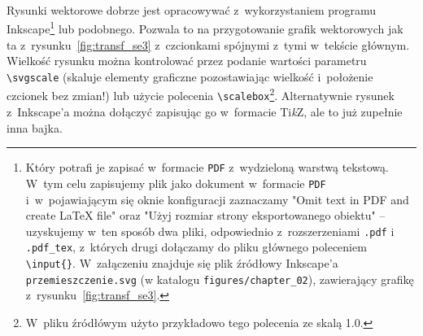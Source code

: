 {\red
  Rysunki wektorowe dobrze jest opracowywać z~wykorzystaniem programu Inkscape\footnote{\red Który potrafi je zapisać w~formacie \texttt{PDF} z~wydzieloną warstwą tekstową. W~tym celu zapisujemy plik jako dokument w~formacie \texttt{PDF} i~w~pojawiającym się oknie konfiguracji zaznaczamy "Omit text in PDF and create LaTeX file" oraz "Użyj rozmiar strony eksportowanego obiektu" -- uzyskujemy w~ten sposób dwa pliki, odpowiednio z~rozszerzeniami \texttt{.pdf} i \texttt{.pdf\_tex}\footnotemark, z~których drugi dołączamy do pliku głównego poleceniem \texttt{\textbackslash input\{\}}.  W~załączeniu znajduje się plik źródłowy Inkscape'a \texttt{przemieszczenie.svg} (w katalogu \texttt{figures/chapter\_02}), zawierający grafikę z~rysunku~\ref{fig:transf_se3}.}  \cite{inkscape} lub podobnego. Pozwala to na przygotowanie grafik wektorowych jak ta z~rysunku~\ref{fig:transf_se3} z~czcionkami spójnymi z~tymi w~tekście głównym. Wielkość rysunku można kontrolować przez podanie wartości parametru \texttt{\textbackslash svgscale} (skaluje elementy graficzne pozostawiając wielkość i~położenie czcionek bez zmian!) lub użycie polecenia \texttt{\textbackslash scalebox}\footnote{\red W~pliku źródłówym użyto przykładowo tego polecenia ze skalą 1.0.}. Alternatywnie rysunek z~Inkscape'a można dołączyć zapisując go w~formacie Ti{\it k}Z, ale to już zupełnie inna bajka.}



\noindent
[\ldots]

